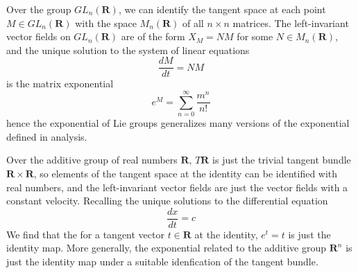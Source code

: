 \begin{example}
    Over the group $GL_n(\mathbf{R})$, we can identify the tangent space at each point $M \in GL_n(\mathbf{R})$ with the space $M_n(\mathbf{R})$ of all $n \times n$ matrices. The left-invariant vector fields on $GL_n(\mathbf{R})$ are of the form $X_M = NM$ for some $N \in M_n(\mathbf{R})$, and the unique solution to the system of linear equations
    \[ \frac{dM}{dt} = NM \]
    is the matrix exponential
    \[ e^M = \sum_{n = 0}^\infty \frac{m^n}{n!} \]
    hence the exponential of Lie groups generalizes many versions of the exponential defined in analysis.
\end{example}

\begin{example}
    Over the additive group of real numbers $\mathbf{R}$, $T\mathbf{R}$ is just the trivial tangent bundle $\mathbf{R} \times \mathbf{R}$, so elements of the tangent space at the identity can be identified with real numbers, and the left-invariant vector fields are just the vector fields with a constant velocity. Recalling the unique solutions to the differential equation
    \[ \frac{dx}{dt} = c \]
    We find that the for a tangent vector $t \in \mathbf{R}$ at the identity, $e^t = t$ is just the identity map. More generally, the exponential related to the additive group $\mathbf{R}^n$ is just the identity map under a suitable idenfication of the tangent bundle.
\end{example}

